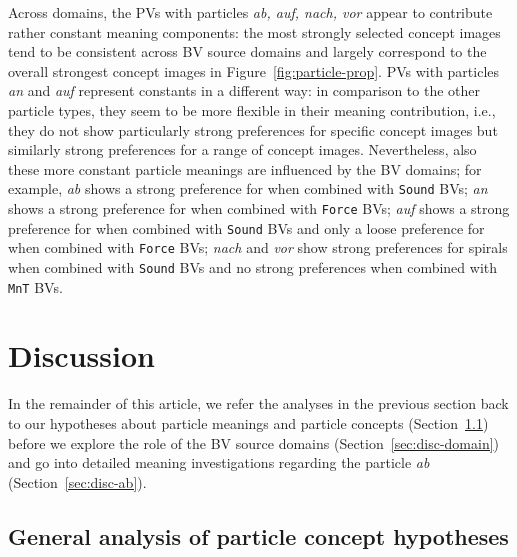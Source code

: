 \documentclass[output=paper]{langsci/langscibook}
\begin{document}
Across domains, the PVs with particles \textit{ab, auf, nach, vor}
appear to contribute rather constant meaning components: the most
strongly selected concept images tend to be consistent across BV source domains
and largely correspond to the overall strongest concept images in
Figure~\ref{fig:particle-prop}. PVs with particles \textit{an} and
\textit{auf} represent constants in a different way: in comparison to
the other particle types, they seem to be more flexible in their
meaning contribution, i.e., they do not show particularly strong
preferences for specific concept images but similarly strong preferences for a
range of concept images.  Nevertheless, also these more constant particle
meanings are influenced by the BV domains; for example, \textit{ab}
shows a strong preference for  when combined with
\texttt{Sound} BVs; \textit{an} shows a strong preference for
 when combined with \texttt{Force} BVs; \textit{auf}
shows a strong preference for  when combined with
\texttt{Sound} BVs and only a loose preference for
 when combined with \texttt{Force} BVs;
\textit{nach} and \textit{vor} show strong preferences for spirals
when combined with \texttt{Sound} BVs and no strong preferences when
combined with \texttt{MnT} BVs.


\clearpage
\section{Discussion}
\label{sec:2discussion}

In the remainder of this article, we refer the analyses in the
previous section back to our hypotheses about particle meanings and
particle concepts (Section~\ref{sec:disc-general}) before we explore
the role of the BV source domains (Section~\ref{sec:disc-domain}) and
go into detailed meaning investigations regarding the particle
\textit{ab} (Section~\ref{sec:disc-ab}).

\subsection{General analysis of particle concept hypotheses}
\label{sec:disc-general}
\end{document}
